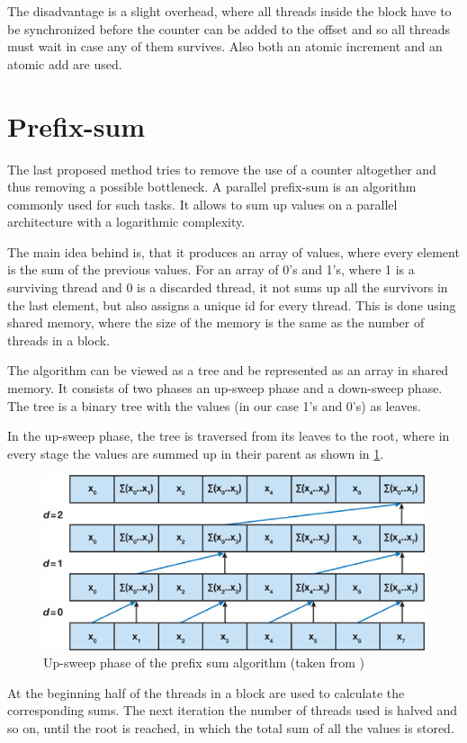 The disadvantage is a slight overhead, where all threads inside the block have to be synchronized before the counter can be added to the offset and so all threads must wait in case any of them survives. Also both an atomic increment and an atomic add are used.

\section{Prefix-sum}

The last proposed method tries to remove the use of a counter altogether and thus removing a possible bottleneck. A parallel prefix-sum is an algorithm commonly used for such tasks. It allows to sum up values on a parallel architecture with a logarithmic complexity.

The main idea behind is, that it produces an array of values, where every element is the sum of the previous values. For an array of 0's and 1's, where 1 is a surviving thread and 0 is a discarded thread, it not sums up all the survivors in the last element, but also assigns a unique id for every thread. This is done using shared memory, where the size of the memory is the same as the number of threads in a block.

The algorithm can be viewed as a tree and be represented as an array in shared memory. It consists of two phases an up-sweep phase and a down-sweep phase. The tree is a binary tree with the values (in our case 1's and 0's) as leaves.

In the up-sweep phase, the tree is traversed from its leaves to the root, where in every stage the values are summed up in their parent as shown in \ref{fig:sweepup}.

\begin{center}
\begin{figure}[h]
	\centering\includegraphics[width=0.6\linewidth]{fig/sweepup.jpg}
	\caption{Up-sweep phase of the prefix sum algorithm (taken from \cite{prefixsum})}
	\label{fig:sweepup}
\end{figure}
\end{center}

At the beginning half of the threads in a block are used to calculate the corresponding sums. The next iteration the number of threads used is halved and so on, until the root is reached, in which the total sum of all the values is stored.

